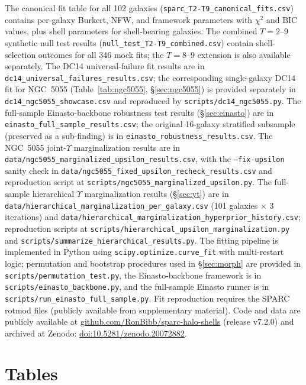 \documentclass[linenumbers]{aastex701}
\newcommand{\Yt}{\Upsilon}
\begin{document}
The canonical fit table for all 102 galaxies (\texttt{sparc\_T2-T9\_canonical\_fits.csv}) contains per-galaxy Burkert, NFW, and framework parameters with $\chi^2$ and BIC values, plus shell parameters for shell-bearing galaxies. The combined $T=2$--$9$ synthetic null test results (\texttt{null\_test\_T2-T9\_combined.csv}) contain shell-selection outcomes for all 346 mock fits; the $T=8$--$9$ extension is also available separately. The DC14 universal-failure fit results are in \texttt{dc14\_universal\_failures\_results.csv}; the corresponding single-galaxy DC14 fit for NGC~5055 (Table~\ref{tab:ngc5055}, \S\ref{sec:ngc5055}) is provided separately in \texttt{dc14\_ngc5055\_showcase.csv} and reproduced by \texttt{scripts/dc14\_ngc5055.py}. The full-sample Einasto-backbone robustness test results (\S\ref{sec:einasto}) are in \texttt{einasto\_full\_sample\_results.csv}; the original 16-galaxy stratified subsample (preserved as a sub-finding) is in \texttt{einasto\_robustness\_results.csv}. The NGC~5055 joint-$\Yt$ marginalization results are in \texttt{data/ngc5055\_marginalized\_upsilon\_results.csv}, with the \texttt{--fix-upsilon} sanity check in \texttt{data/ngc5055\_fixed\_upsilon\_recheck\_results.csv} and reproduction script at \texttt{scripts/ngc5055\_marginalized\_upsilon.py}. The full-sample hierarchical $\Yt$ marginalization results (\S\ref{sec:yt}) are in \texttt{data/hierarchical\_marginalization\_per\_galaxy.csv} (101 galaxies $\times$ 3 iterations) and \texttt{data/hierarchical\_marginalization\_hyperprior\_history.csv}; reproduction scripts at \texttt{scripts/hierarchical\_upsilon\_marginalization.py} and \texttt{scripts/summarize\_hierarchical\_results.py}. The fitting pipeline is implemented in Python using \texttt{scipy.optimize.curve\_fit} with multi-restart logic; permutation and bootstrap procedures used in \S\ref{sec:morph} are provided in \texttt{scripts/permutation\_test.py}, the Einasto-backbone framework is in \texttt{scripts/einasto\_backbone.py}, and the full-sample Einasto runner is in \texttt{scripts/run\_einasto\_full\_sample.py}. Fit reproduction requires the SPARC rotmod files (publicly available from \citealt{Lelli2016} supplementary material). Code and data are publicly available at \href{https://github.com/RonBibb/sparc-halo-shells}{github.com/RonBibb/sparc-halo-shells} (release v7.2.0) and archived at Zenodo: \href{https://doi.org/10.5281/zenodo.20072882}{doi:10.5281/zenodo.20072882}.


\clearpage
{}
\section*{Tables}
\end{document}
